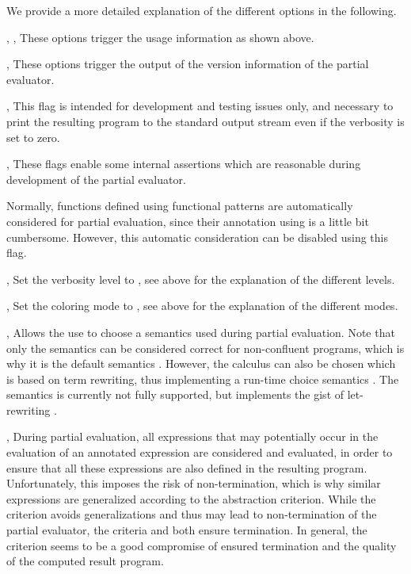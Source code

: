 We provide a more detailed explanation of the different options
in the following.

\begin{description}
\item{, , }
These options trigger the usage information as shown above.

\item{, }
These options trigger the output of the version information
of the partial evaluator.

\item{, }
This flag is intended for development and testing issues only,
and necessary to print the resulting program to the standard output
stream even if the verbosity is set to zero.

\item{, }
These flags enable some internal assertions which are reasonable
during development of the partial evaluator.

\item{}
Normally, functions defined using functional patterns are automatically
considered for partial evaluation, since their annotation using 
is a little bit cumbersome.
However, this automatic consideration can be disabled using this flag.

\item{, }
Set the verbosity level to , see above for the explanation
of the different levels.

\item{, }
Set the coloring mode to , see above for the explanation
of the different modes.

\item{, }
Allows the use to choose a semantics used during partial evaluation.
Note that only the  semantics can be considered correct
for non-confluent programs, which is why it is the default semantics
\cite{Peemoeller2016}.
However, the  calculus can also be chosen which is based
on term rewriting, thus implementing a run-time choice semantics
\cite{AlbertHanusVidal02JFLP}.
The  semantics is currently not fully supported,
but implements the gist of let-rewriting \cite{Lopez-Fraguas07}.

\item{, }
During partial evaluation, all expressions that may potentially
occur in the evaluation of an annotated expression are considered and
evaluated, in order to ensure that all these expressions are also
defined in the resulting program.
Unfortunately, this imposes the risk of non-termination,
which is why similar expressions are generalized according to the
abstraction criterion.
While the  criterion avoids generalizations
and thus may lead to non-termination of the partial evaluator,
the criteria  and  both ensure termination.
In general, the criterion  seems to be a good compromise
of ensured termination and the quality of the computed result program.


\end{description}
